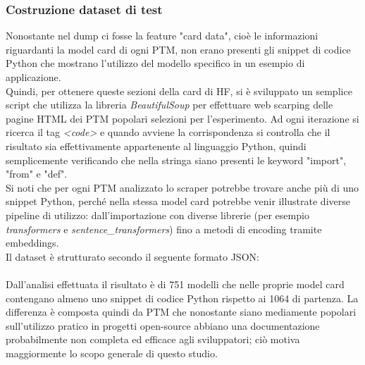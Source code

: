 \documentclass{article}
\begin{document}
\subsubsection{Costruzione dataset di test}
Nonostante nel dump \cite{ait_hfcommunity_2023}  ci fosse la feature "card data", cioè le informazioni riguardanti la model card di ogni PTM, non erano presenti gli snippet di codice Python che mostrano l'utilizzo del modello specifico in un esempio di applicazione.\\  
Quindi, per ottenere queste sezioni della card di HF, si è sviluppato un semplice script che utilizza la libreria \textit{BeautifulSoup}\cite{Richardson_Beautiful_Soup} per effettuare web scarping delle pagine HTML dei PTM popolari selezioni per l'esperimento. Ad ogni iterazione si ricerca il tag \textit{\textless code\textgreater} e quando avviene la corrispondenza si controlla che il risultato sia effettivamente appartenente al linguaggio Python, quindi semplicemente verificando che nella stringa siano presenti le keyword "import", "from" e "def".\\
Si noti che per ogni PTM analizzato lo scraper potrebbe trovare anche più di uno snippet Python, perché nella stessa model card potrebbe venir illustrate diverse pipeline di utilizzo: dall'importazione con diverse librerie (per esempio \textit{transformers} e \textit{sentence\_transformers}) fino a metodi di encoding tramite embeddings.\\
Il dataset è strutturato secondo il seguente formato JSON:\\
\\
Dall'analisi effettuata il risultato è di 751 modelli che nelle proprie model card contengano almeno uno snippet di codice Python rispetto ai 1064 di partenza. La differenza è composta quindi da PTM che nonostante siano mediamente popolari sull'utilizzo pratico in progetti open-source abbiano una documentazione probabilmente non completa ed efficace agli sviluppatori; ciò motiva maggiormente lo scopo generale di questo studio.
\end{document}

